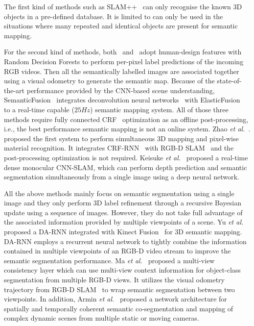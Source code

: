 \documentclass[letterpaper, 10 pt, conference]{ieeeconf}
\begin{document}
The first kind of methods such as SLAM++~\cite{salas2013slam++} can only recognise the known 3D objects in a pre-defined database. It is limited to can only be used in the situations where many repeated and identical objects are present for semantic mapping. 

For the second kind of methods, both~\cite{hermans2014dense} and~\cite{vineet2015incremental} adopt human-design features with Random Decision Forests to perform per-pixel label predictions of the incoming RGB videos. Then all the semantically labelled images are associated together using a visual odometry to generate the semantic map. Because of the state-of-the-art performance provided by the CNN-based scene understanding, SemanticFusion~\cite{mccormac2017semanticfusion} integrates deconvolution neural networks~\cite{noh2015learning} with ElasticFusion~\cite{whelan2015elasticfusion} to a real-time capable ($25Hz$) semantic mapping system. All of those three methods require fully connected CRF~\cite{krahenbuhl2011efficient} optimization as an offline post-processing, i.e., the best performance semantic mapping is not an online system. Zhao \emph{et al.}~\cite{zhao2017fully}. proposed the first system to perform simultaneous 3D mapping and pixel-wise material recognition. It integrates CRF-RNN~\cite{zheng2015conditional} with RGB-D SLAM~\cite{endres20143} and the post-processing optimization is not required. Keisuke \emph{et al.}~\cite{tateno2017cnn} proposed a real-time dense monocular CNN-SLAM, which can perform depth prediction and semantic segmentation simultaneously from a single image using a deep neural network.

All the above methods mainly focus on semantic segmentation using a single image and they only perform 3D label refinement through a recursive Bayesian update using a sequence of images. However, they do not take full advantage of the associated information provided by multiple viewpoints of a scene. Yu \emph{et al.}~\cite{xiang2017rnn} proposed a DA-RNN integrated with Kinect Fusion~\cite{newcombe2011kinectfusion} for 3D semantic mapping. DA-RNN employs a recurrent neural network to tightly combine the information contained in multiple viewpoints of an RGB-D video stream to improve the semantic segmentation performance. Ma \emph{et al.}~\cite{ma2017multi} proposed a multi-view consistency layer which can use multi-view context information for object-class segmentation from multiple RGB-D views. It utilizes the visual odometry trajectory from RGB-D SLAM~\cite{endres20143} to wrap semantic segmentation between two viewpoints. In addition, Armin \emph{et al.}~\cite{mustafa2017semantically} proposed a network architecture for spatially and temporally coherent semantic co-segmentation and mapping of complex dynamic scenes from multiple static or moving cameras. 
\end{document}
